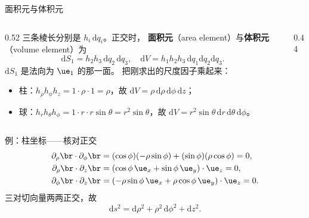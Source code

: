 \documentclass[fontset=windows, chinese, 10pt, xcolor=dvipsnames]{beamer}
\begin{document}
\begin{frame}{面积元与体积元}
  \begin{columns}[c]
    \begin{column}{0.52\textwidth}
      三条棱长分别是 $h_i\,\mathrm{d}q_i$。正交时，
      \textbf{面积元}（area element）与\textbf{体积元}（volume element）为
      \begin{equation*}
        \mathrm{d}S_1=h_2 h_3\,\mathrm{d}q_2\,\mathrm{d}q_3,
        \quad
        \mathrm{d}V=h_1 h_2 h_3\,\mathrm{d}q_1\mathrm{d}q_2\mathrm{d}q_3.
      \end{equation*}
      $\mathrm{d}S_1$ 是法向为 $\ue_1$ 的那一面。
      把刚求出的尺度因子乘起来：
      \begin{itemize}
        \item 柱：$h_{\rho}h_{\phi}h_z=1\cdot\rho\cdot 1=\rho$，故
          $\mathrm{d}V=\rho\,\mathrm{d}\rho\,\mathrm{d}\phi\,\mathrm{d}z$；
        \item 球：$h_r h_{\theta}h_{\phi}=1\cdot r\cdot r\sin\theta=r^2\sin\theta$，故
          $\mathrm{d}V=r^2\sin\theta\,\mathrm{d}r\,\mathrm{d}\theta\,\mathrm{d}\phi$。
      \end{itemize}
    \end{column}
    \begin{column}{0.44\textwidth}
      \centering
      \scalebox{0.85}{}
    \end{column}
  \end{columns}
\end{frame}

\begin{frame}{例：柱坐标——核对正交}
  \begin{align*}
    \partial_\rho\br\cdot\partial_\phi\br
    &=(\cos\phi)(-\rho\sin\phi)+(\sin\phi)(\rho\cos\phi)
     =0,\\
    \partial_\rho\br\cdot\partial_z\br
    &=(\cos\phi\,\ue_x+\sin\phi\,\ue_y)\cdot\ue_z
     =0,\\
    \partial_\phi\br\cdot\partial_z\br
    &=(-\rho\sin\phi\,\ue_x+\rho\cos\phi\,\ue_y)\cdot\ue_z
     =0.
  \end{align*}
  三对切向量两两正交，故
  \begin{equation*}
    \mathrm{d}s^2=\mathrm{d}\rho^2+\rho^2\,\mathrm{d}\phi^2+\mathrm{d}z^2.
  \end{equation*}
\end{frame}
\end{document}
